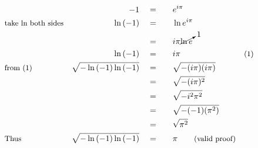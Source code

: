 \begin{alignat*}{5}
&\,&-1\quad&=\quad&&e^{i\pi}\\
&\small\text{take ln both sides}&\ln{(-1)}\quad&=&&\ln{e^{i\pi}}\\
&\,&\,&=&&i\pi\cancelto{1}{\ln{e}}\\
&\,&\ln{(-1)}\quad&=&&i\pi&\small\text{(1)}\\
&\small\text{from (1)}&\sqrt{-\ln{(-1)}\ln{(-1)}}\quad&=&&\sqrt{-(i\pi)(i\pi)}\\
&\,&\,&=&&\sqrt{-(i\pi)^2}\\
&\,&\,&=&&\sqrt{-i^2\pi^2}\\
&\,&\,&=&&\sqrt{-(-1)(\pi^2)}\\
&\,&\,&=&&\sqrt{\pi^2}\\
&\small\text{Thus}&\sqrt{-\ln{(-1)}\ln{(-1)}}\quad&=&&\pi\qquad\small\text{(valid proof)}
\end{alignat*}
